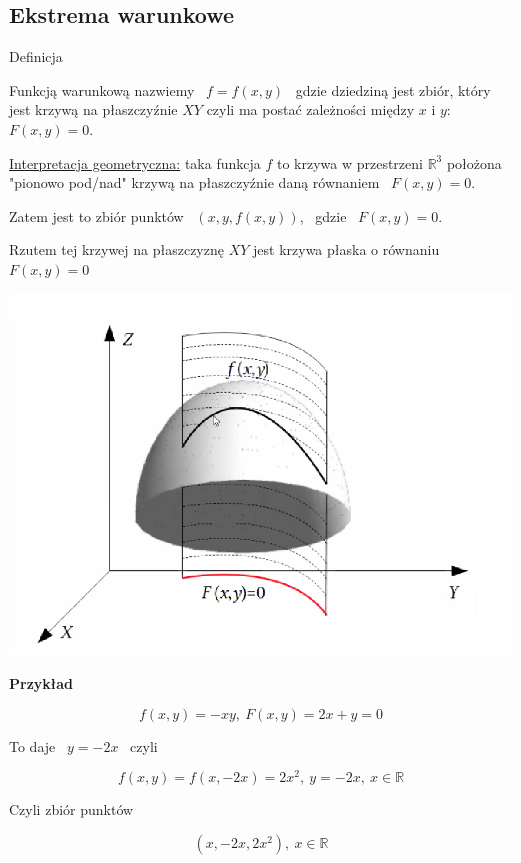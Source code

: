 \subsection*{Ekstrema warunkowe}

\begin{tw}{Definicja}

Funkcją warunkową nazwiemy \ $ f = f(x,y) $ \ gdzie dziedziną jest zbiór, który jest krzywą na płaszczyźnie $XY$ czyli ma postać zależności
między $x$ i $y$: \ $F(x,y) = 0$.

\underline{Interpretacja geometryczna:} taka funkcja $f$ to krzywa w przestrzeni $ \mathbb{R}^3 $ położona "pionowo pod/nad" krzywą na płaszczyźnie
daną równaniem \ $F(x,y) = 0$.

Zatem jest to zbiór punktów \ $ (x, y, f(x,y)) $, \ gdzie \ $ F(x,y) = 0 $.

Rzutem tej krzywej na płaszczyznę $XY$ jest krzywa płaska o równaniu $F(x,y) = 0$
\end{tw}

\begin{center}
\includegraphics[scale=0.4]{img/rzut_plaszczyznaXY.png}
\end{center}

\textbf{Przykład}

\[ f(x,y) = -xy, \ F(x,y) = 2x + y = 0 \]

\begin{center}To daje \ $ y = -2x $ \ czyli\end{center} 
\[ f(x,y) = f(x, -2x) = 2x^2, \ y=-2x, \ x\in \mathbb{R} \]

\begin{center}Czyli zbiór punktów\end{center}
\[ (x, -2x, 2x^2), \ x \in \mathbb{R} \]


